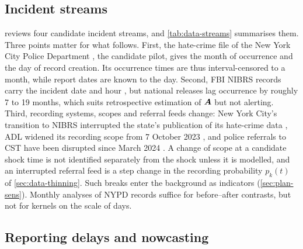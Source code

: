 \subsection{Incident streams}\label{sec:data-incidents}

 reviews four candidate incident streams, and \cref{tab:data-streams}
summarises them. Three points matter for what follows. First, the hate-crime file of the
New York City Police Department \citep{nypdhate}, the candidate pilot, gives the month of
occurrence and the day of record creation. Its occurrence times are thus interval-censored
to a month, while report dates are known to the day. Second, FBI NIBRS records carry the
incident date and hour \citep{fbi2025nibrs}, but national releases lag occurrence by
roughly 7 to 19 months, which suits retrospective estimation of $\bm{A}$ but not alerting.
Third, recording systems, scopes and referral feeds change: New York City's transition to
NIBRS interrupted the state's publication of its hate-crime data \citep{osc2024hate}, ADL
widened its recording scope from 7 October 2023 \citep{adl2025audit}, and police referrals
to CST have been disrupted since March 2024 \citep{cst2026incidents}. A change of scope at a
candidate shock time is not identified separately from the shock unless it is modelled, and
an interrupted referral feed is a step change in the recording probability $p_k(t)$ of
\cref{sec:data-thinning}. Such breaks enter the background as indicators
(\cref{sec:plan-sens}). Monthly analyses of NYPD records \citep{rosenbaum2025} suffice for
before--after contrasts, but not for kernels on the scale of days.

\subsection{Reporting delays and nowcasting}\label{sec:data-delays}

